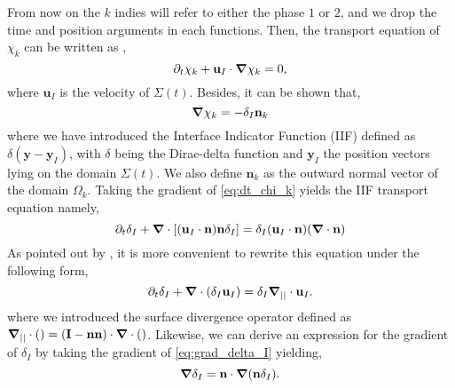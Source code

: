 From now on the $k$ indies will refer to either the phase $1$ or $2$, and we drop the time and position arguments in each functions. 
Then, the transport equation of $\chi_k$ can be written as \citep{drew1983mathematical,kataoka1986local,morel2015mathematical},
\begin{equation}
    \partial_t \chi_k
    + \textbf{u}_I \cdot \bm{\nabla} \chi_k
    = 0,
    \label{eq:dt_chi_k}
\end{equation}
where $\textbf{u}_I$ is the velocity of $\Sigma(t)$.
Besides, it can be shown \citep{tryggvason2011direct,drew1983mathematical,kataoka1986local,bothe2022sharp} that,
\begin{equation}
    \bm{\nabla} \chi_k
    = - \delta_I \textbf{n}_k
    \label{eq:grad_chi_k}
\end{equation}
where we have introduced the Interface Indicator Function (IIF) defined as $\delta(\textbf{y}-\textbf{y}_I)$, with $\delta$ being the Dirac-delta function and $\textbf{y}_I$ the position vectors lying on the domain $\Sigma(t)$.
We also define $\textbf{n}_k$ as the outward normal vector of the domain $\Omega_k$.
Taking the gradient of \ref{eq:dt_chi_k} yields the IIF transport equation namely,
\begin{equation}
    \partial_t \delta_I
    + \bm{\nabla} \cdot \left[(\textbf{u}_I\cdot\textbf{n})\textbf{n} \delta_I\right]
    = \delta_I (\textbf{u}_I\cdot\textbf{n})(\bm{\nabla} \cdot\textbf{n})
\end{equation}
As pointed out by \citet{morel2007surface}, it is more convenient to rewrite this equation under the following form,
\begin{equation}
    \partial_t \delta_I
    + \bm{\nabla} \cdot (\delta_I \textbf{u}_I)
    = \delta_I \bm{\nabla}_{||} \cdot \textbf{u}_I.
    \label{eq:dt_delta_I}
\end{equation}
where we introduced the surface divergence operator defined as $\bm{\nabla}_{||} \cdot ()= (\textbf{I}-\textbf{nn})\cdot \bm{\nabla} \cdot ()$.
Likewise, we can derive an expression for the gradient of $\delta_I$ by taking the gradient of \ref{eq:grad_delta_I} yielding,
\begin{equation}
    \bm{\nabla}\delta_I 
    = \textbf{n} \cdot \bm{\nabla} (\textbf{n} \delta_I).
    \label{eq:grad_delta_I}
\end{equation}


